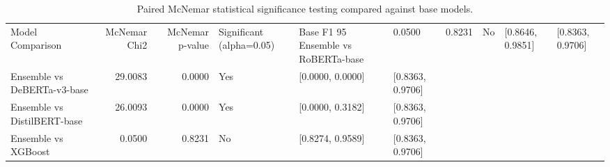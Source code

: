 \begin{table}
\caption{Paired McNemar statistical significance testing compared against base models.}
\label{tab:significance}
\begin{tabular}{lrrlll}
\toprule
Model Comparison & McNemar Chi2 & McNemar p-value & Significant (alpha=0.05) & Base F1 95%
\midrule
Ensemble vs RoBERTa-base & 0.0500 & 0.8231 & No & [0.8646, 0.9851] & [0.8363, 0.9706] \\
Ensemble vs DeBERTa-v3-base & 29.0083 & 0.0000 & Yes & [0.0000, 0.0000] & [0.8363, 0.9706] \\
Ensemble vs DistilBERT-base & 26.0093 & 0.0000 & Yes & [0.0000, 0.3182] & [0.8363, 0.9706] \\
Ensemble vs XGBoost & 0.0500 & 0.8231 & No & [0.8274, 0.9589] & [0.8363, 0.9706] \\
\bottomrule
\end{tabular}
\end{table}
